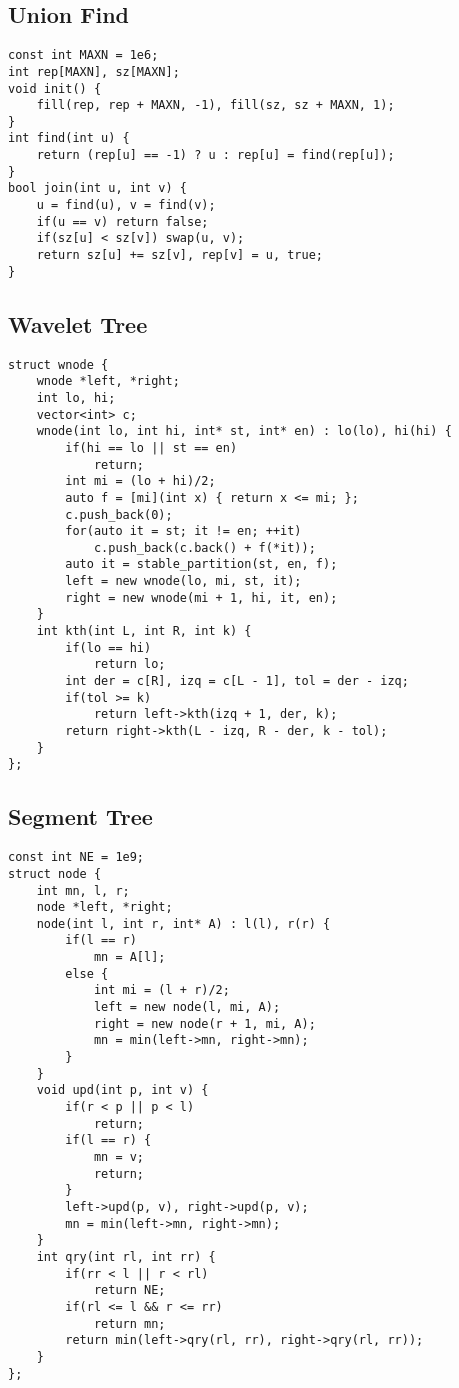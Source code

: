 \documentclass[twocolumn]{article}
\begin{document}
\subsection{Union Find}
\lstset{basicstyle=\footnotesize\ttfamily,breaklines=true,tabsize=2,language=C++,frame=leftline, numbers=left, numberstyle=\tiny, numbersep=5pt}
\begin{lstlisting}
const int MAXN = 1e6;
int rep[MAXN], sz[MAXN];
void init() {
	fill(rep, rep + MAXN, -1), fill(sz, sz + MAXN, 1);
}
int find(int u) {
	return (rep[u] == -1) ? u : rep[u] = find(rep[u]);
}
bool join(int u, int v) {
	u = find(u), v = find(v);
	if(u == v) return false;
	if(sz[u] < sz[v]) swap(u, v);
	return sz[u] += sz[v], rep[v] = u, true;
}
\end{lstlisting}
\subsection{Wavelet Tree}
\lstset{basicstyle=\footnotesize\ttfamily,breaklines=true,tabsize=2,language=C++,frame=leftline, numbers=left, numberstyle=\tiny, numbersep=5pt}
\begin{lstlisting}
struct wnode {
	wnode *left, *right;
	int lo, hi;
	vector<int> c;
	wnode(int lo, int hi, int* st, int* en) : lo(lo), hi(hi) {
		if(hi == lo || st == en)
			return;
		int mi = (lo + hi)/2;
		auto f = [mi](int x) { return x <= mi; };
		c.push_back(0);
		for(auto it = st; it != en; ++it)
			c.push_back(c.back() + f(*it));
		auto it = stable_partition(st, en, f);
		left = new wnode(lo, mi, st, it);
		right = new wnode(mi + 1, hi, it, en);
	}
	int kth(int L, int R, int k) {
		if(lo == hi)
			return lo;
		int der = c[R], izq = c[L - 1], tol = der - izq;
		if(tol >= k)
			return left->kth(izq + 1, der, k);
		return right->kth(L - izq, R - der, k - tol);
	}
};
\end{lstlisting}
\subsection{Segment Tree}
\lstset{basicstyle=\footnotesize\ttfamily,breaklines=true,tabsize=2,language=C++,frame=leftline, numbers=left, numberstyle=\tiny, numbersep=5pt}
\begin{lstlisting}
const int NE = 1e9;
struct node {
	int mn, l, r;
	node *left, *right;
	node(int l, int r, int* A) : l(l), r(r) {
		if(l == r)
			mn = A[l];
		else {
			int mi = (l + r)/2;
			left = new node(l, mi, A);
			right = new node(r + 1, mi, A);
			mn = min(left->mn, right->mn);
		}
	}
	void upd(int p, int v) {
		if(r < p || p < l)
			return;
		if(l == r) {
			mn = v;
			return;
		}
		left->upd(p, v), right->upd(p, v);
		mn = min(left->mn, right->mn);
	}
	int qry(int rl, int rr) {
		if(rr < l || r < rl)
			return NE;
		if(rl <= l && r <= rr)
			return mn;
		return min(left->qry(rl, rr), right->qry(rl, rr));
	}
};
\end{lstlisting}
\end{document}
